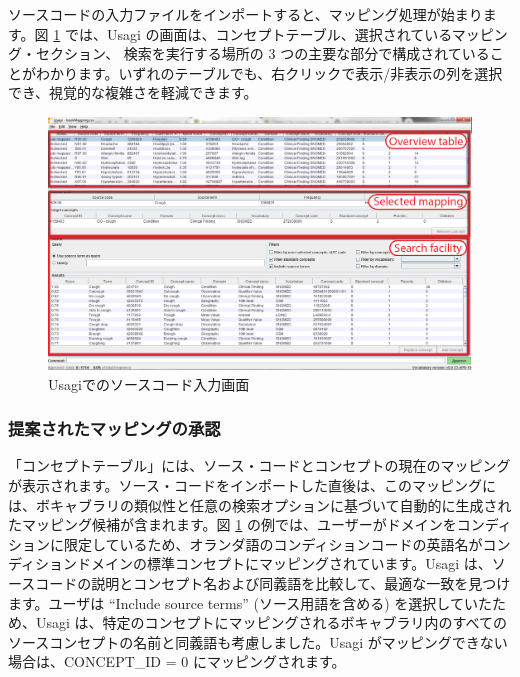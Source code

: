 \documentclass[
  11pt]{book}
\theoremstyle{definition}
\theoremstyle{definition}
\theoremstyle{definition}
\theoremstyle{definition}
\theoremstyle{remark}
\begin{document}
ソースコードの入力ファイルをインポートすると、マッピング処理が始まります。図 \ref{fig:usagiOverview} では、Usagi の画面は、コンセプトテーブル、選択されているマッピング・セクション、 検索を実行する場所の 3 つの主要な部分で構成されていることがわかります。いずれのテーブルでも、右クリックで表示/非表示の列を選択でき、視覚的な複雑さを軽減できます。

\begin{figure}

{\centering \includegraphics[width=1\linewidth]{images/ExtractTransformLoad/usagiOverview} 

}

\caption{Usagiでのソースコード入力画面}\label{fig:usagiOverview}
\end{figure}

\subsubsection*{提案されたマッピングの承認}\label{ux63d0ux6848ux3055ux308cux305fux30deux30c3ux30d4ux30f3ux30b0ux306eux627fux8a8d}

「コンセプトテーブル」には、ソース・コードとコンセプトの現在のマッピングが表示されます。ソース・コードをインポートした直後は、このマッピングには、ボキャブラリの類似性と任意の検索オプションに基づいて自動的に生成されたマッピング候補が含まれます。図 \ref{fig:usagiOverview} の例では、ユーザーがドメインをコンディションに限定しているため、オランダ語のコンディションコードの英語名がコンディションドメインの標準コンセプトにマッピングされています。Usagi は、ソースコードの説明とコンセプト名および同義語を比較して、最適な一致を見つけます。ユーザは ``Include source terms'' (ソース用語を含める) を選択していたため、Usagi は、特定のコンセプトにマッピングされるボキャブラリ内のすべてのソースコンセプトの名前と同義語も考慮しました。Usagi がマッピングできない場合は、CONCEPT\_ID = 0 にマッピングされます。
\end{document}
